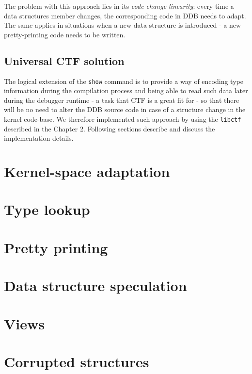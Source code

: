 The problem with this approach lies in its {\it code change linearity}: every
time a data structures member changes, the corresponding code in DDB needs to
adapt. The same applies in situations when a new data structure is introduced -
a new pretty-printing code needs to be written.

\subsection{Universal CTF solution}
The logical extension of the {\tt show} command is to provide a way of encoding
type information during the compilation process and being able to read such
data later during the debugger runtime - a task that CTF is a great fit for -
so that there will be no need to alter the DDB source code in case of a
structure change in the kernel code-base. We therefore implemented such
approach by using the {\tt libctf} described in the Chapter 2. Following
sections describe and discuss the implementation details.

\section{Kernel-space adaptation}
\section{Type lookup}
\section{Pretty printing}
\section{Data structure speculation}
\section{Views}
\section{Corrupted structures}

